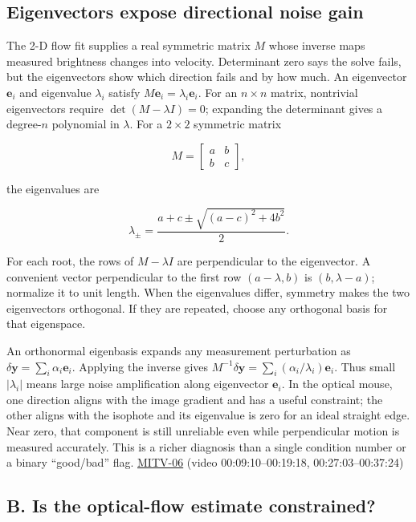 \subsection{Eigenvectors expose directional noise gain}\label{04-visual-computing-ii-ch030-eigenvectors-expose-directional-noise-gain}

The 2-D flow fit supplies a real symmetric matrix \(M\) whose inverse maps measured brightness changes into velocity. Determinant zero says the solve fails, but the eigenvectors show which direction fails and by how much. An eigenvector \(\mathbf e_i\) and eigenvalue \(\lambda_i\) satisfy \(M\mathbf e_i=\lambda_i\mathbf e_i\). For an \(n\times n\) matrix, nontrivial eigenvectors require \(\det(M-\lambda I)=0\); expanding the determinant gives a degree-\(n\) polynomial in \(\lambda\). For a \(2\times2\) symmetric matrix

\[
M=\begin{bmatrix}a&b\\b&c\end{bmatrix},
\]

the eigenvalues are

\[
\lambda_{\pm}=\frac{a+c\pm\sqrt{(a-c)^2+4b^2}}{2}.
\]

For each root, the rows of \(M-\lambda I\) are perpendicular to the eigenvector. A convenient vector perpendicular to the first row \((a-\lambda,b)\) is \((b,\lambda-a)\); normalize it to unit length. When the eigenvalues differ, symmetry makes the two eigenvectors orthogonal. If they are repeated, choose any orthogonal basis for that eigenspace.

An orthonormal eigenbasis expands any measurement perturbation as \(\delta\mathbf y=\sum_i \alpha_i\mathbf e_i\). Applying the inverse gives \(M^{-1}\delta\mathbf y=\sum_i (\alpha_i/\lambda_i)\mathbf e_i\). Thus small \(|\lambda_i|\) means large noise amplification along eigenvector \(\mathbf e_i\). In the optical mouse, one direction aligns with the image gradient and has a useful constraint; the other aligns with the isophote and its eigenvalue is zero for an ideal straight edge. Near zero, that component is still unreliable even while perpendicular motion is measured accurately. This is a richer diagnosis than a single condition number or a binary ``good/bad'' flag. \hyperref[04-visual-computing-ii-ch036-mitv-06---photometric-stereo-noise-gain-error-amplification-eigenvalues-and-eigenvectors-review]{MITV-06} (video 00:09:10--00:19:18, 00:27:03--00:37:24)

\subsection{B. Is the optical-flow estimate constrained?}\label{04-visual-computing-ii-ch030-b.-is-the-optical-flow-estimate-constrained}

